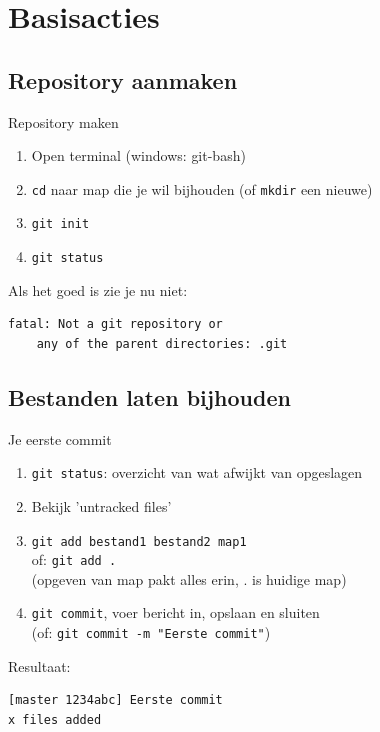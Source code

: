 \section{Basisacties}

\subsection{Repository aanmaken}
\begin{frame}[fragile]{Repository maken}
	\begin{enumerate}
		\item Open terminal (windows: \alert{git-bash})
		\item \texttt{cd} naar map die je wil bijhouden
			(of \texttt{mkdir} een nieuwe)
		\item \texttt{git init}
		\item \texttt{git status}
	\end{enumerate}
	Als het goed is zie je nu \alert{niet}:
	\begin{verbatim}
fatal: Not a git repository or 
	any of the parent directories: .git
	\end{verbatim}
\end{frame}

\subsection{Bestanden laten bijhouden}
\begin{frame}[fragile]{Je eerste commit}
	\begin{enumerate}
		\item \texttt{git status}: overzicht van wat afwijkt van opgeslagen
		\item Bekijk 'untracked files'
		\item \texttt{git add bestand1 bestand2 map1}\\ of:
			\texttt{git add .}\\
			(opgeven van map pakt alles erin, . is huidige map)
		\item \texttt{git commit}, voer bericht in, opslaan en sluiten\\
			(of: \texttt{git commit -m "Eerste commit"})
	\end{enumerate}
	Resultaat: 
	\begin{verbatim}
[master 1234abc] Eerste commit
x files added
	\end{verbatim}
\end{frame}

